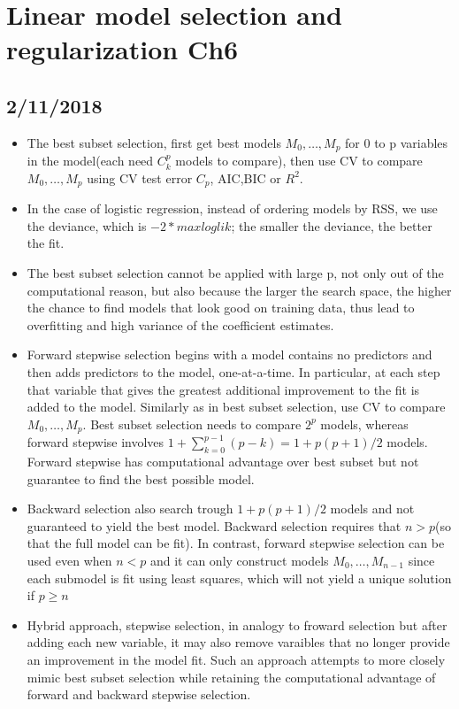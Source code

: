 \documentclass[a4paper, 12pt]{article}
\begin{document}
	
\section*{Linear model selection and regularization Ch6 }
\subsection{2/11/2018}
\begin{itemize}
	\item The best subset selection, first get best models $M_0,\ldots,M_p$ for 0 to p variables in the model(each need $C_k^p$ models to compare), then use CV to compare $M_0,\ldots,M_p$ using CV test error $C_p$, AIC,BIC or $R^2$.
	\item In the case of logistic regression, instead of ordering models by RSS, we use the deviance, which is $-2*maxloglik$; the smaller the deviance, the better the fit. 
	\item The best subset selection cannot be applied with large p, not only out of the computational reason, but also because the larger the search space, the higher the chance to find models that look good on training data, thus lead to overfitting and high variance of the coefficient estimates.
	\item Forward stepwise selection begins with a model contains no predictors and then adds predictors to the model, one-at-a-time. In particular, at each step that variable that gives the greatest additional improvement to the fit is added to the model. Similarly as in best subset selection, use CV to compare $M_0,\ldots,M_p$. Best subset selection needs to compare $2^p$ models, whereas forward stepwise involves $1+\sum_{k=0}^{p-1}(p-k)=1+p(p+1)/2$ models. Forward stepwise has computational advantage over best subset but not guarantee to find the best possible model.
	\item Backward selection also search trough $1+p(p+1)/2$ models and not guaranteed to yield the best model. Backward selection requires that $n > p$(so that the full model can be fit). In contrast, forward stepwise selection can be used even when $n<p$ and it can only construct models $M_0,\ldots,M_{n-1}$ since each submodel is fit using least squares, which will not yield a unique solution if $p\ge n$
	\item Hybrid approach, stepwise selection, in analogy to froward selection but after adding each new variable, it may also remove varaibles that no longer provide an improvement in the model fit. Such an approach attempts to more closely mimic best subset selection while retaining the computational advantage of forward and backward stepwise selection.

\end{itemize}
\end{document}
